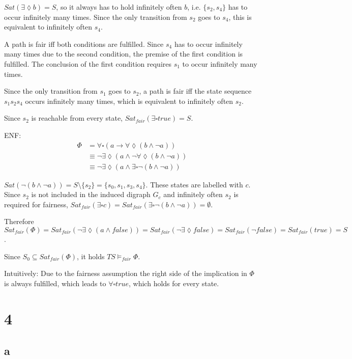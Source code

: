 \documentclass[11pt]{article}
\begin{document}
$Sat(\exists \lozenge b) = S$, so it always has to hold infinitely often $b$, i.e. $\{s_2, s_4\}$ has to occur infinitely many times.
Since the only transition from $s_2$ goes to $s_4$, this is equivalent to infinitely often $s_4$.

A path is fair iff both conditions are fulfilled.
Since $s_4$ has to occur infinitely many times due to the second condition, the premise of the first condition is fulfilled.
The conclusion of the first condition requires $s_1$ to occur infinitely many times.

Since the only transition from $s_1$ goes to $s_2$, a path is fair iff the state sequence $s_1 s_2 s_4$ occurs infinitely many times, which is equivalent to infinitely often $s_2$.

Since $s_2$ is reachable from every state, $Sat_{fair}(\exists \square true) = S$.

ENF:\begin{align*}
    \Phi &= \forall \square(a \rightarrow \forall \lozenge (b \land \lnot a))\\
         &\equiv \lnot \exists \lozenge (a \land \lnot \forall \lozenge (b \land \lnot a))\\
         &\equiv \lnot \exists \lozenge (a \land \exists \square \lnot (b \land \lnot a))
\end{align*} 

$Sat(\lnot (b \land \lnot a)) = S \setminus \{s_2\} = \{s_0, s_1, s_3, s_4\}$. These states are labelled with $c$.
Since $s_2$ is not included in the induced digraph $G_c$ and infinitely often $s_2$ is required for fairness, $Sat_{fair}(\exists \square c) = Sat_{fair}(\exists \square \lnot (b \land \lnot a)) = \emptyset$.

Therefore $Sat_{fair}(\Phi) = Sat_{fair}(\lnot \exists \lozenge (a \land false))
= Sat_{fair}(\lnot \exists \lozenge false)
= Sat_{fair}(\lnot false)
= Sat_{fair}(true)
= S$.

Since $S_0 \subseteq Sat_{fair}(\Phi)$, it holds $TS \models_{fair} \Phi$.

Intuitively: Due to the fairness assumption the right side of the implication in $\Phi$ is always fulfilled, which leads to $\forall \square true$, which holds for every state.

\section{4}

\subsection{a}
\end{document}
